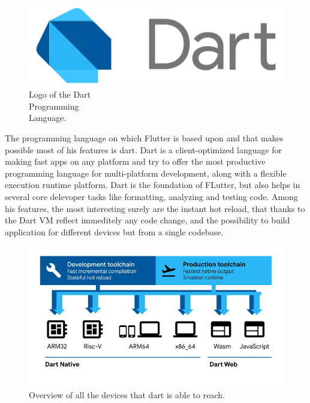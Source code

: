 \begin{figure} %
    \centering
    \includegraphics[width=\linewidth]{images/dart.png}
    \caption{Logo of the Dart\\Programming\\Language.}
\end{figure}

The programming language on which Flutter is based upon and that makes possible most of his features is dart. Dart is a client-optimized language for making fast apps on any platform and try to offer the most productive programming language for multi-platform development, along with a flexible execution runtime platform. Dart is the foundation of FLutter, but also helps in several core delevoper tasks like formatting, analyzing and testing code. Among his features, the most interesting surely are the instant hot reload, that thanks to the Dart VM reflect immeditely any code change, and the possibility to build application for different devices but from a single codebase. 

\begin{figure}
    \includegraphics[width=1.0\linewidth]{./images/dart_platforms.png}
    \caption{Overview of all the devices that dart is able to reach.}
    \label{fig:dartPlatforms}
\end{figure}

